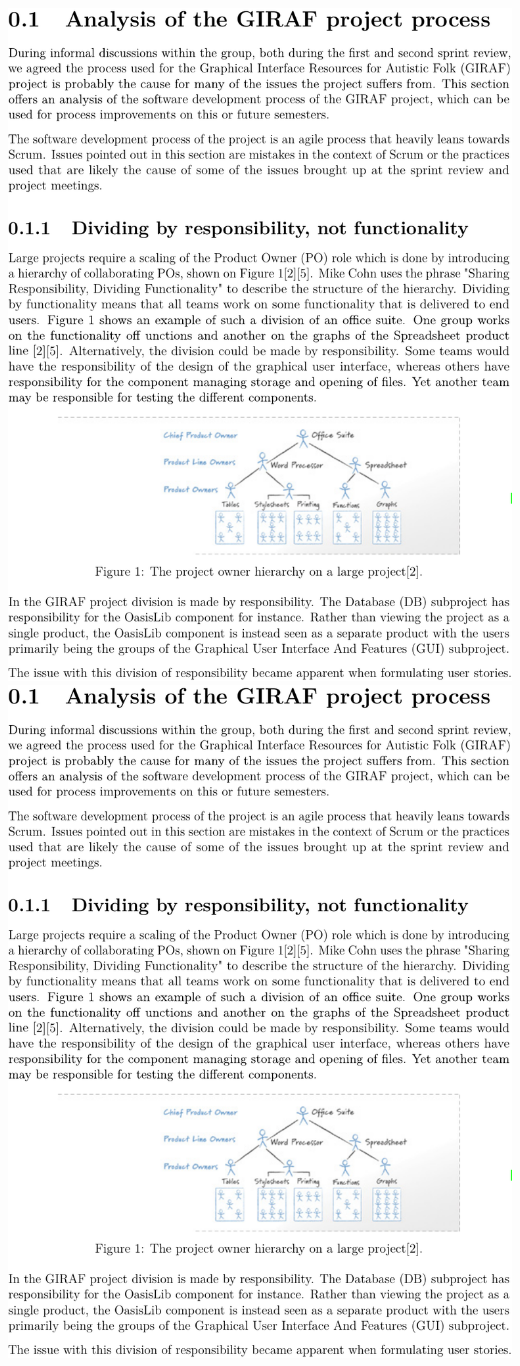 \includegraphics[page=4,width=\textwidth]{part_appendix/sw601f15.pdf}
\includegraphics[page=5,width=\textwidth]{part_appendix/sw601f15.pdf}
